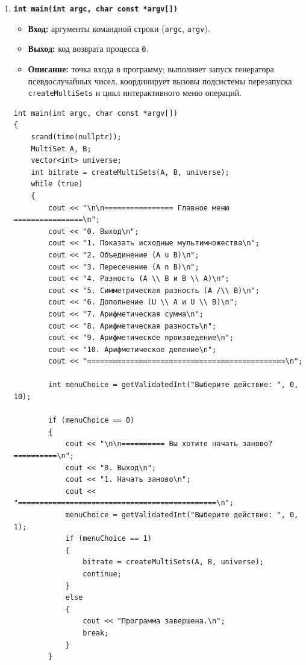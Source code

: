 \documentclass[14pt, a4paper]{extarticle}
\begin{document}
\begin{enumerate}[label=\arabic*., resume]
		\item \textbf{\texttt{int main(int argc, char const *argv[])}}
		\begin{itemize}[leftmargin=*, noitemsep]
			\item \textbf{Вход:} аргументы командной строки (\texttt{argc}, \texttt{argv}).
			\item \textbf{Выход:} код возврата процесса \texttt{0}.
			\item \textbf{Описание:} точка входа в программу; выполняет запуск генератора псевдослучайных чисел, координирует вызовы подсистемы перезапуска \texttt{createMultiSets} и цикл интерактивного меню операций.
		\end{itemize}
		\begin{lstlisting}[caption={Функция main()}, label={lst:func_main}]
int main(int argc, char const *argv[])
{
    srand(time(nullptr));
    MultiSet A, B;
    vector<int> universe;
    int bitrate = createMultiSets(A, B, universe);
    while (true)
    {
        cout << "\n\n================ Главное меню ================\n";
        cout << "0. Выход\n";
        cout << "1. Показать исходные мультимножества\n";
        cout << "2. Объединение (A u B)\n";
        cout << "3. Пересечение (A n B)\n";
        cout << "4. Разность (A \\ B и B \\ A)\n";
        cout << "5. Симметрическая разность (A /\\ B)\n";
        cout << "6. Дополнение (U \\ A и U \\ B)\n";
        cout << "7. Арифметическая сумма\n";
        cout << "8. Арифметическая разность\n";
        cout << "9. Арифметическое произведение\n";
        cout << "10. Арифметическое деление\n";
        cout << "==============================================\n";

        int menuChoice = getValidatedInt("Выберите действие: ", 0, 10);

        if (menuChoice == 0)
        {
            cout << "\n\n========== Вы хотите начать заново? ==========\n";
            cout << "0. Выход\n";
            cout << "1. Начать заново\n";
            cout << "==============================================\n";
            menuChoice = getValidatedInt("Выберите действие: ", 0, 1);
            if (menuChoice == 1)
            {
                bitrate = createMultiSets(A, B, universe);
                continue;
            }
            else
            {
                cout << "Программа завершена.\n";
                break;
            }
        }


\end{lstlisting}
\end{enumerate}
\end{document}
